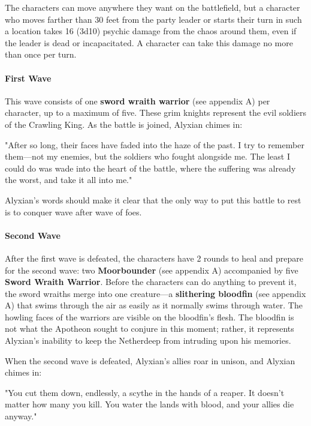 \documentclass[10pt,a4paper,twoside,twocolumn,openany,nodeprecatedcode]{dndbook}
\begin{document}
The characters can move anywhere they want on the battlefield, but a character who moves farther than 30 feet from the party leader or starts their turn in such a location takes 16 (3d10) psychic damage from the chaos around them, even if the leader is dead or incapacitated. A character can take this damage no more than once per turn.

\paragraph{First Wave}
This wave consists of one \textbf{sword wraith warrior} (see appendix A) per character, up to a maximum of five. These grim knights represent the evil soldiers of the Crawling King. As the battle is joined, Alyxian chimes in:

\begin{DndReadAloud}{}
"After so long, their faces have faded into the haze of the past. I try to remember them—not my enemies, but the soldiers who fought alongside me. The least I could do was wade into the heart of the battle, where the suffering was already the worst, and take it all into me."

\end{DndReadAloud}

Alyxian's words should make it clear that the only way to put this battle to rest is to conquer wave after wave of foes.

\paragraph{Second Wave}
After the first wave is defeated, the characters have 2 rounds to heal and prepare for the second wave: two \textbf{Moorbounder} (see appendix A) accompanied by five \textbf{Sword Wraith Warrior}. Before the characters can do anything to prevent it, the sword wraiths merge into one creature—a \textbf{slithering bloodfin} (see appendix A) that swims through the air as easily as it normally swims through water. The howling faces of the warriors are visible on the bloodfin's flesh. The bloodfin is not what the Apotheon sought to conjure in this moment; rather, it represents Alyxian's inability to keep the Netherdeep from intruding upon his memories.

When the second wave is defeated, Alyxian's allies roar in unison, and Alyxian chimes in:

\begin{DndReadAloud}{}
"You cut them down, endlessly, a scythe in the hands of a reaper. It doesn't matter how many you kill. You water the lands with blood, and your allies die anyway."

\end{DndReadAloud}
\end{document}
